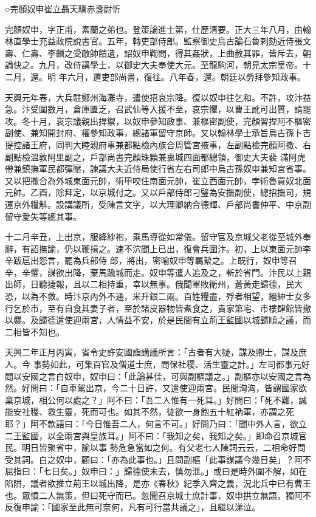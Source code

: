 
\begin{pinyinscope}

 ○完顏奴申崔立聶天驥赤盞尉忻



 完顏奴申，字正甫，素蘭之弟也。登策論進士第，仕歷清要。正大三年八月，由翰林直學士充益政院說書官。五年，轉吏部侍郎。監察御史烏古論石魯剌劾近侍張文壽、仁壽、李麟之受敵帥饋遺，詔奴申鞫問，得其姦狀，上曲赦其罪，皆斥去，朝論快之。九月，改侍講學士，以御史大夫奉使大元。至龍駒河，朝見太宗皇帝。十二月，還。明
 年六月，遷吏部尚書，復往。八年春，還。朝廷以勞拜參知政事。



 天興元年春，大兵駐鄭州海灘寺，遣使招哀宗降。復以奴申往乞和。不許，攻汴益急。汴受圍數月，倉庫匱乏，召武仙等入援不至，哀宗懼，以曹王訛可出質，請罷攻。冬十月，哀宗議親出捍禦，以奴申參知政事、兼樞密副使，完顏習捏阿不樞密副使、兼知開封府、權參知政事，總諸軍留守京師。又以翰林學士承旨烏古孫卜吉提控諸王府，同判大睦親府事兼都點檢內族合周管宮掖事，左副點檢完顏阿撒、右副點檢溫敦阿里副之，戶部尚書完顏珠顆兼裏城四面都總領，御史大夫裴
 滿阿虎帶兼鎮撫軍民都彈壓，諫議大夫近侍局使行省左右司郎中烏古孫奴申兼知宮省事。又以把撒合為外城東面元帥，術甲咬住南面元帥，崔立西面元帥，孛術魯買奴北面元帥。乙酉，除拜定，以京城付之。又以戶部侍郎刁璧為安撫副使，總招撫司，規運京外糧斛。設講議所，受陳言文字，以大理卿納合德輝、戶部尚書仲平、中京副留守愛失等總其事。



 十二月辛丑，上出京，服絳紗袍，乘馬導從如常儀。留守官及京城父老從至城外奉辭，有詔撫諭，仍以鞭揖之。速不泬聞上已出，復會兵圍汴。初，上以東面元帥李辛跋扈出怨言，罷為兵部侍
 郎，將出，密喻奴申等羈縶之。上既行，奴申等召辛，辛懼，謀欲出降，棄馬踰城而走。奴申等遣人追及之，斬於省門。汴民以上親出師，日聽捷報，且以二相持重，幸以無事。俄聞軍敗衛州，蒼黃走歸德，民大恐，以為不救。時汴京內外不通，米升銀二兩。百姓糧盡，殍者相望，縉紳士女多行乞於市，至有自食其妻子者，至於諸皮器物皆煮食之，貴家第宅、市樓肆館皆撤以爨。及歸德遣使迎兩宮，人情益不安，於是民間有立荊王監國以城歸順之議，而二相皆不知也。



 天興二年正月丙寅，省令史許安國詣講議所言：「古者有大疑，謀及卿士，謀及庶人。今
 事勢如此，可集百官及僧道士庶，問保社稷、活生靈之計。」左司都事元好問以安國之言白奴申，奴申曰：「此論甚佳，可與副樞議之。」副樞亦以安國之言為然。好問曰：「自車駕出京，今二十日許，又遣使迎兩宮。民間洶洶，皆謂國家欲棄京城，相公何以處之？」阿不曰：「吾二人惟有一死耳。」好問曰：「死不難，誠能安社稷、救生靈，死而可也。如其不然，徒欲一身飽五十紅衲軍，亦謂之死耶？」阿不款語曰：「今日惟吾二人，何言不可。」好問乃曰：「聞中外人言，欲立二王監國，以全兩宮與皇族耳。」阿不曰：「我知之矣，我知之矣。」即命召京城官民。明日皆聚省中，諭以事
 勢危急當如之何。有父老七人陳詞云云，二相命好問受其詞。白之奴申，顧曰：「亦為此事也。」且問副樞「此事謀議今幾日矣」？阿不屈指曰：「七日矣。」奴申曰：」歸德使未去，慎勿泄。」或曰是時外圍不解，如在陷阱，議者欲推立荊王以城出降，是亦《春秋》紀季入齊之義，況北兵中已有曹王也。眾憤二人無策，但曰死守而已。忽聞召京城士庶計事，奴申拱立無語，獨阿不反復申諭：「國家至此無可奈何，凡有可行當共議之」，且繼以涕泣。




\end{pinyinscope}
